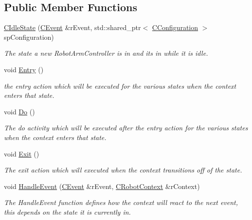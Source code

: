 \subsection*{Public Member Functions}
\begin{DoxyCompactItemize}
\item 
\hyperlink{classCIdleState_a644c79b15da13871f33656e34ee30c45}{C\+Idle\+State} (\hyperlink{classCEvent}{C\+Event} \&r\+Event, std\+::shared\+\_\+ptr$<$ \hyperlink{classCConfiguration}{C\+Configuration} $>$ sp\+Configuration)
\begin{DoxyCompactList}\small\item\em The state a new Robot\+Arm\+Controller is in and its in while it is idle. \end{DoxyCompactList}\item 
void \hyperlink{classCIdleState_afcfc7e601c50b99c27380b9541fc3795}{Entry} ()
\begin{DoxyCompactList}\small\item\em the entry action which will be executed for the various states when the context enters that state. \end{DoxyCompactList}\item 
void \hyperlink{classCIdleState_a7ae1fe9a96dfb78faaebd068bb8ecae7}{Do} ()
\begin{DoxyCompactList}\small\item\em The do activity which will be executed after the entry action for the various states when the context enters that state. \end{DoxyCompactList}\item 
void \hyperlink{classCIdleState_a634bf12d9a7f29504c7dc6df7d419835}{Exit} ()
\begin{DoxyCompactList}\small\item\em The exit action which will executed when the context transitions off of the state. \end{DoxyCompactList}\item 
void \hyperlink{classCIdleState_a12d0c6b590c56cdc9018524d632d4871}{Handle\+Event} (\hyperlink{classCEvent}{C\+Event} \&r\+Event, \hyperlink{classCRobotContext}{C\+Robot\+Context} \&r\+Context)
\begin{DoxyCompactList}\small\item\em The Handle\+Event function defines how the context will react to the next event, this depends on the state it is currently in. \end{DoxyCompactList}\end{DoxyCompactItemize}


